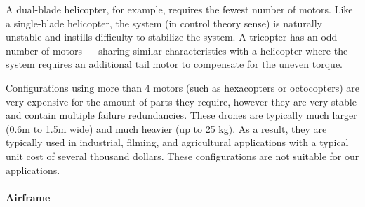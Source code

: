A dual-blade helicopter, for example, requires the fewest number of motors. Like a single-blade helicopter, the system (in control theory sense) is naturally unstable and instills difficulty to stabilize the system. A tricopter has an odd number of motors --- sharing similar characteristics with a helicopter where the system requires an additional tail motor to compensate for the uneven torque. 

Configurations using more than 4 motors (such as hexacopters or octocopters) are very expensive for the amount of parts they require, however they are very stable and contain multiple failure redundancies. These drones are typically much larger (0.6m to 1.5m wide) and much heavier (up to 25 kg). As a result, they are typically used in industrial, filming, and agricultural applications with a typical unit cost of several thousand dollars. These configurations are not suitable for our applications.

\paragraph{Airframe}

